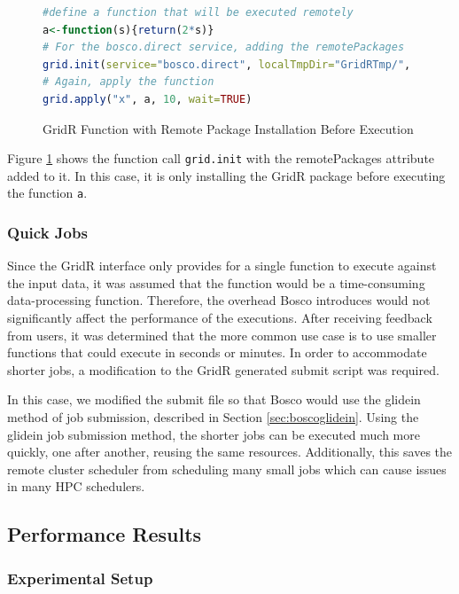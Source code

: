 \begin{figure}[h!t]
\begin{lstlisting}[language=R]
#define a function that will be executed remotely
a<-function(s){return(2*s)}
# For the bosco.direct service, adding the remotePackages
grid.init(service="bosco.direct", localTmpDir="GridRTmp/", remotePackages=c("GridR_0.9.8.tar.gz"))
# Again, apply the function
grid.apply("x", a, 10, wait=TRUE)
\end{lstlisting}
\caption{GridR Function with Remote Package Installation Before Execution}
\label{fig:gridrremotepackages}
\end{figure}

Figure \ref{fig:gridrremotepackages} shows the function call \texttt{grid.init} with the remotePackages attribute added to it.  In this case, it is only installing the GridR package before executing the function \texttt{a}.

\subsubsection{Quick Jobs}
Since the GridR interface only provides for a single function to execute against the input data, it was assumed that the function would be a time-consuming data-processing function.  Therefore, the overhead Bosco introduces would not significantly affect the performance of the executions.  After receiving feedback from users, it was determined that the more common use case is to use smaller functions that could execute in seconds or minutes.  In order to accommodate shorter jobs, a modification to the GridR generated submit script was required.

In this case, we modified the submit file so that Bosco would use the glidein method of job submission, described in Section \ref{sec:boscoglidein}.  Using the glidein job submission method, the shorter jobs can be executed much more quickly, one after another, reusing the same resources.  Additionally, this saves the remote cluster scheduler from scheduling many small jobs which can cause issues in many HPC schedulers.


\subsection{Performance Results}

\subsubsection{Experimental Setup}  

